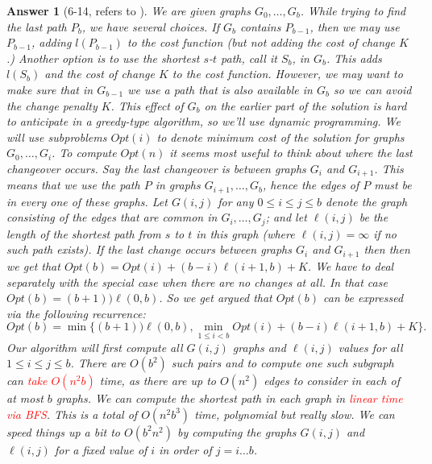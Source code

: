 \documentclass[11pt]{article}
\theoremstyle{numberplain}
\theoremstyle{nonumberplain}
\newtheorem{ans}{Answer}
\newcommand{\0}{{\mathbf{0}}}
\begin{document}
\begin{ans}[6-14, refers to \cite{solcornell}]
We are given graphs $G_0,\ldots,G_b$. While trying to find the last path $P_b$, we have several choices. If $G_b$ contains $P_{b-1}$, then we may use $P_{b-1}$, adding $l(P_{b-1})$ to the cost function (but not adding the       
cost of change $K$.) Another option is to use the shortest $s$-$t$ path, call it $S_b$, in $G_b$. This adds $l(S_b)$ and the 
cost of change $K$ to the cost   
function. However, we may want to make sure that in $G_{b-1}$ we use a path
that is also available in $G_b$ so we can 
avoid the change penalty $K$. This    
effect of $G_b$ on the earlier part of the solution is hard to anticipate 
in a greedy-type algorithm, so we'll use dynamic programming. 
We will use subproblems $Opt(i)$ to denote minimum cost of the solution 
for graphs  $G_0,\ldots,G_i$. 
To compute $Opt(n)$ it seems most useful to think about where the 
last changeover occurs. Say the last changeover is between graphs $G_i$ and
$G_{i+1}$. This means that we use the path $P$ 
in graphs $G_{i+1},\ldots,G_b$,       
hence the edges of $P$ must be in every one of these graphs. 
Let $G(i,j)$ for any $0 \le i \le j 
\le b$ denote the graph consisting of the  
edges that are common in  $G_i,\ldots,G_j$; and let $\ell(i,j)$ be the 
length of the shortest path from $s$ to $t$ in this graph (where 
$\ell(i,j)=\infty$ if no such path exists). 
If the  last change occurs between graphs $G_i$ and $G_{i+1}$ then then
we get that  $Opt(b)=Opt(i) +(b-i)\ell(i+1,b)+K$.
We have to deal separately with the special case when there are no 
changes at all. In that case $Opt(b)=(b+1))\ell(0,b)$.
So we get argued that $Opt(b)$ can be expressed via the following 
recurrence:
$$Opt(b)=\min\{ (b+1))\ell(0,b), \min_{1\le i <b } Opt(i) +(b-i)\ell(i+1,b)+K\}.$$  
Our algorithm will first compute all  $G(i,j)$ graphs and  $\ell(i,j)$
values for all $1 \le i \le j \le b$. There are $O(b^2)$ such pairs and 
to compute one such subgraph can \textcolor{red}{take $O(n^2b)$} time, as there are 
up to $O(n^2)$ edges to consider in each of 
at most $b$ graphs. We can compute the  
shortest path in each graph in \textcolor{red}{linear time via BFS}. This is a total
of $O(n^2b^3)$ time, polynomial but really slow. We can 
speed things up a bit to $O(b^2 n^2)$ by computing the graphs  $G(i,j)$ 
and $\ell(i,j)$ for a fixed value of $i$ in order of $j=i \ldots b$.
\end{ans}
\end{document}
